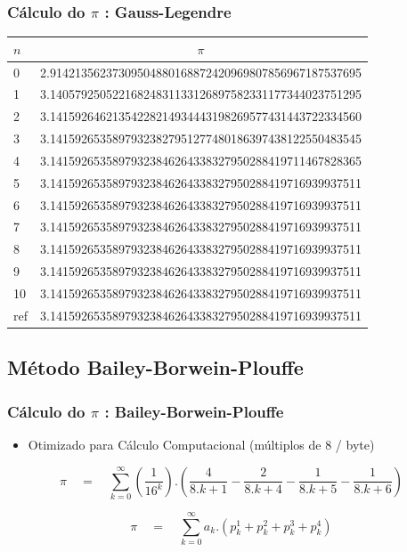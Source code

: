 \documentclass{beamer}
\newcommand\safepi[0]{
	\texorpdfstring{$\pi$}{Pi}
}
\begin{document}
\begin{frame}

\frametitle{Cálculo do \safepi: Gauss-Legendre}

\scriptsize
\renewcommand*{\arraystretch}{1.3}
\begin{table}[h]
	\centering
	\begin{tabular}{|l|c|}
		\hline
		$n$ & $\pi$\\ 
		\hline
		0& 2.91421356237309504880168872420969807856967187537695\\
		1& 3.14057925052216824831133126897582331177344023751295\\
		2& 3.14159264621354228214934443198269577431443722334560\\
		3& 3.14159265358979323827951277480186397438122550483545\\
		4& 3.14159265358979323846264338327950288419711467828365\\
		5& 3.14159265358979323846264338327950288419716939937511\\
		6& 3.14159265358979323846264338327950288419716939937511\\
		7& 3.14159265358979323846264338327950288419716939937511\\
		8& 3.14159265358979323846264338327950288419716939937511\\
		9& 3.14159265358979323846264338327950288419716939937511\\
	   10& 3.14159265358979323846264338327950288419716939937511\\			   
	   \hline
	   ref& 3.14159265358979323846264338327950288419716939937511\\
	   \hline
	\end{tabular}
\end{table}
\renewcommand*{\arraystretch}{1}
\normalsize
	
\end{frame}


\begin{frame}

\subsection{Método Bailey-Borwein-Plouffe}
\frametitle{Cálculo do \safepi: Bailey-Borwein-Plouffe}

\begin{itemize}
    \item Otimizado para Cálculo Computacional (múltiplos de 8 / byte)
\end{itemize}

\begin{equation}
	\pi \quad = \quad \sum_{k=0}^{\infty}\left(\frac{1}{16^k}\right).
	\left(
		\frac{4}{8.k + 1} - \frac{2}{8.k + 4} - \frac{1}{8.k + 5} - \frac{1}{8.k + 6}
	\right)
\end{equation}

\begin{equation}
	\pi \quad = \quad \sum_{k=0}^{\infty} a_k.
	\left(p^1_k + p^2_k + p^3_k + p^4_k\right)
\end{equation}
		
\end{frame}
\end{document}
